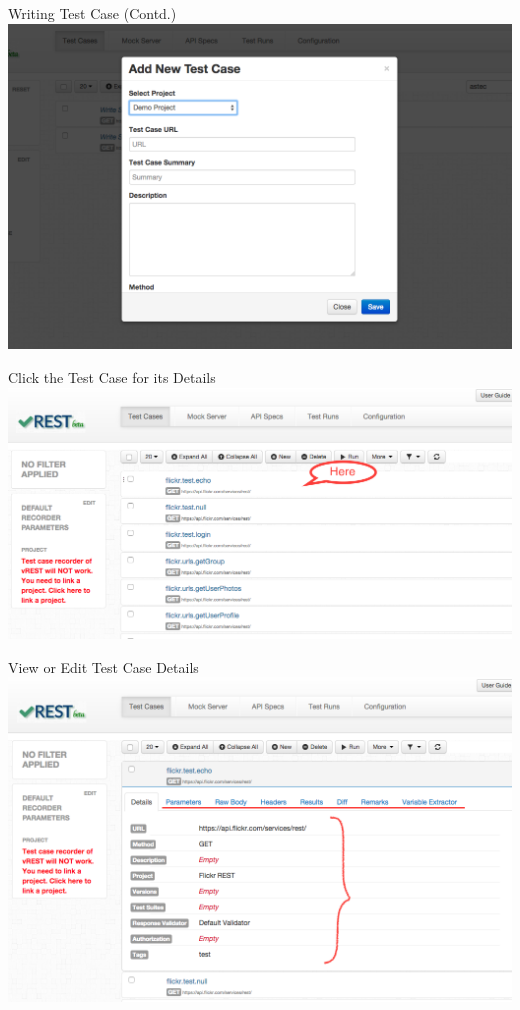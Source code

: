 \documentclass{beamer}
\begin{document}
\begin{frame}{Writing Test Case (Contd.)}
    \includegraphics[scale=0.30]{images/add_test_case_modal.PNG}
\end{frame}
\begin{frame}{Click the Test Case for its Details}
    \includegraphics[scale=0.30]{images/click_test_case.PNG}
\end{frame}
\begin{frame}{View or Edit Test Case Details}
    \includegraphics[scale=0.30]{images/test_case_details.PNG}
\end{frame}
\end{document}
